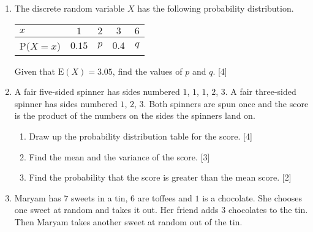 \begin{enumerate}
	
	
	
	
	
	\item  The discrete random variable $X$ has the following probability distribution.
	
	 \begin{table}[!htpb]
		
		\centering
		
		\begin{tabular}{|l|c|c|c|c|}
			\hline
			$x $     & $1$ & $2$ &  $3$ & $6$  \\ \hline
			P($X=x$) & $0.15$ & $p$ & $0.4$ &$q$  \\ \hline
		\end{tabular}
	\end{table}
	
	Given that $\text{E}(X) =3.05$, find the values of $p$ and $q$. \hfill [4]
	
	
	
	\item  A fair five-sided spinner has sides numbered $1$, $1$, $1$, $2$, $3$. A fair three-sided spinner has sides numbered $1$, $2$, $3$. Both spinners are spun once and the score is the product of the numbers on the sides the spinners land on.
	
	\begin{enumerate}[label=(\roman*)]
		\item Draw up the probability distribution table for the score. \hfill[4]
		\item Find the mean and the variance of the score. \hfill[3]
		\item Find the probability that the score is greater than the mean score. \hfill [2]
	\end{enumerate}
	
	
	
	
	\item  Maryam has $7$ sweets in a tin,  $6$ are toffees and $1$ is a chocolate. She chooses one sweet at random	and takes it out. Her friend adds $3$ chocolates to the tin. Then Maryam takes another sweet at random	out of the tin. 
	

\end{enumerate}
